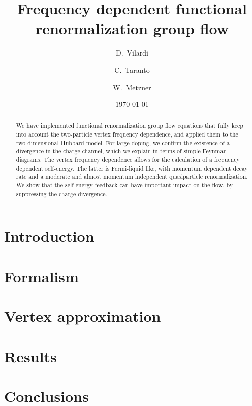 \documentclass[aps,prb,twocolumn,showpacs,groupedaddress]{revtex4-1}
\begin{document}
\title{Frequency dependent functional renormalization group flow}

\author {D.~Vilardi}
\author{C.~Taranto}
\author{W.~Metzner}

\date{\today}

\begin{abstract}
We have implemented functional renormalization group flow equations that fully keep into account the two-particle vertex frequency dependence, and applied them to the two-dimensional Hubbard model.
For large doping, we confirm the existence of a divergence in the charge channel, 
 which we explain in terms of simple Feynman diagrams. 
The vertex frequency dependence allows for the calculation of a frequency dependent self-energy. The latter is Fermi-liquid like, with momentum dependent decay rate and a moderate and almost momentum independent quasiparticle renormalization.
We show that the self-energy feedback can have important impact on the flow,  by suppressing the charge divergence.
\end{abstract}

\pacs{}
\maketitle

\section{Introduction}
\label{sec:introduction}


\section{Formalism}
\label{sec:formalism}

\section{Vertex approximation}
\label{sec:vertex}


\section{Results}
\label{sec:results}


\section{Conclusions}
\label{sec:conclusions}

\end{document}
